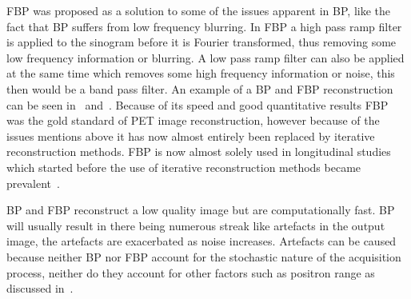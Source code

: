             \gls{FBP} was proposed as a solution to some of the issues apparent in \gls{BP}, like the fact that \gls{BP} suffers from low frequency blurring. In \gls{FBP} a high pass ramp filter is applied to the sinogram before it is Fourier transformed, thus removing some low frequency information or blurring. A low pass ramp filter can also be applied at the same time which removes some high frequency information or noise, this then would be a band pass filter. An example of a \gls{BP} and \gls{FBP} reconstruction can be seen in~ and~. Because of its speed and good quantitative results \gls{FBP} was the gold standard of \gls{PET} image reconstruction, however because of the issues mentions above it has now almost entirely been replaced by iterative reconstruction methods. \gls{FBP} is now almost solely used in longitudinal studies which started before the use of iterative reconstruction methods became prevalent~.
            
            \gls{BP} and \gls{FBP} reconstruct a low quality image but are computationally fast. \gls{BP} will usually result in there being numerous streak like artefacts in the output image, the artefacts are exacerbated as noise increases. Artefacts can be caused because neither \gls{BP} nor \gls{FBP} account for the stochastic nature of the acquisition process, neither do they account for other factors such as positron range as discussed in~.
            
            
